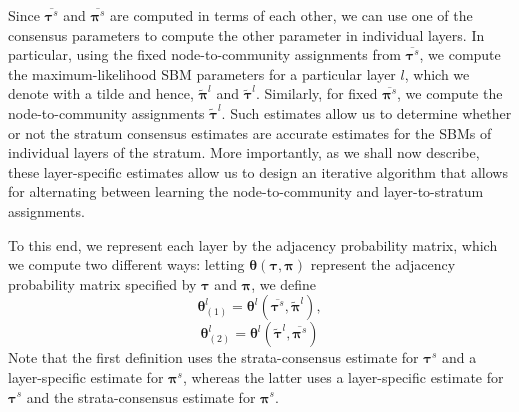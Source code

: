 Since $\overline{{\boldsymbol \tau}^{s}}$ and $\overline{{\boldsymbol \pi}^{s}}$ are computed in terms of each other, we can use one of the consensus parameters to compute the other parameter in individual layers. 
%
In particular, using the fixed node-to-community assignments from $\overline{{\boldsymbol \tau}^{s}}$, we compute the maximum-likelihood SBM parameters  for a particular layer $l$, which we denote with a tilde and hence, $\tilde{\boldsymbol{\pi}}^l$ and $\tilde{\boldsymbol{\tau}}^l$. Similarly, for fixed $\overline{{\boldsymbol \pi}^{s}}$, we compute the node-to-community assignments $\tilde{\boldsymbol{\tau}}^l$. Such estimates allow us to determine whether or not the stratum consensus estimates are accurate estimates for the SBMs of individual layers of the stratum. 
%
More importantly, as we shall now describe, these layer-specific estimates allow us to design an iterative algorithm that allows for alternating between learning the node-to-community and layer-to-stratum assignments.

To this end, we represent each layer by the adjacency probability matrix, which we compute two different ways: letting ${\boldsymbol{\theta}}({\boldsymbol{\tau}},{\boldsymbol{\pi}})$ represent the adjacency probability matrix specified by ${\boldsymbol{\tau}}$ and ${\boldsymbol{\pi}}$, %
we define
%
\begin{equation}
{\boldsymbol{\theta}}^{l}_{(1)}={\boldsymbol{\theta}}^{l}(\overline{{\boldsymbol{\tau}^{s}}},\tilde{\boldsymbol{\pi}}^{l}) ,
\end{equation}
%
%
\begin{equation}
{\boldsymbol{\theta}}^{l}_{(2)}={\boldsymbol{\theta}}^{l}(\tilde{{\boldsymbol{\tau}}}^{l},\overline{{\boldsymbol{\pi}^{s}}})
\end{equation}
%
Note that the first definition uses the strata-consensus estimate for ${\boldsymbol \tau}^s$ and a layer-specific estimate for ${\boldsymbol \pi}^s$, whereas the latter uses a layer-specific estimate for ${\boldsymbol \tau}^s$ and the strata-consensus estimate for ${\boldsymbol \pi}^s$.

